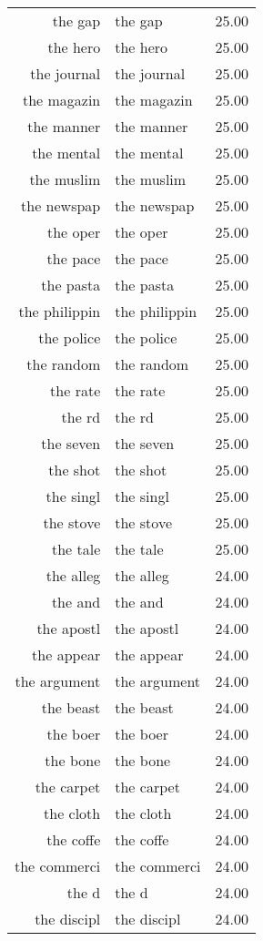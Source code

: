 \begin{table}[ht]
\begin{tabular}{rlr}
  the gap & the gap & 25.00 \\ 
  the hero & the hero & 25.00 \\ 
  the journal & the journal & 25.00 \\ 
  the magazin & the magazin & 25.00 \\ 
  the manner & the manner & 25.00 \\ 
  the mental & the mental & 25.00 \\ 
  the muslim & the muslim & 25.00 \\ 
  the newspap & the newspap & 25.00 \\ 
  the oper & the oper & 25.00 \\ 
  the pace & the pace & 25.00 \\ 
  the pasta & the pasta & 25.00 \\ 
  the philippin & the philippin & 25.00 \\ 
  the police & the police & 25.00 \\ 
  the random & the random & 25.00 \\ 
  the rate & the rate & 25.00 \\ 
  the rd & the rd & 25.00 \\ 
  the seven & the seven & 25.00 \\ 
  the shot & the shot & 25.00 \\ 
  the singl & the singl & 25.00 \\ 
  the stove & the stove & 25.00 \\ 
  the tale & the tale & 25.00 \\ 
  the alleg & the alleg & 24.00 \\ 
  the and & the and & 24.00 \\ 
  the apostl & the apostl & 24.00 \\ 
  the appear & the appear & 24.00 \\ 
  the argument & the argument & 24.00 \\ 
  the beast & the beast & 24.00 \\ 
  the boer & the boer & 24.00 \\ 
  the bone & the bone & 24.00 \\ 
  the carpet & the carpet & 24.00 \\ 
  the cloth & the cloth & 24.00 \\ 
  the coffe & the coffe & 24.00 \\ 
  the commerci & the commerci & 24.00 \\ 
  the d & the d & 24.00 \\ 
  the discipl & the discipl & 24.00 \\ 

\end{tabular}
\end{table}
